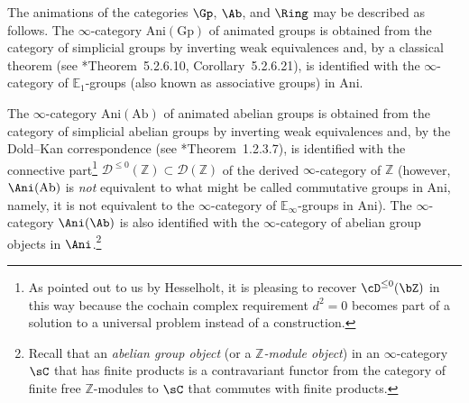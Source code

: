 \beg \label{ani-egs}
The animations of the categories $\Gp$, $\Ab$, and $\Ring$ may be described as follows.
\benuma
\m
The $\infty$-category $\mathrm{Ani}(\mathrm{Gp})$ of animated groups is obtained from the category of simplicial groups by inverting weak equivalences and, by a classical theorem (see \cite{HA}*{Theorem~5.2.6.10, Corollary~5.2.6.21}), is identified with the $\infty$-category of $\mathbb E_1$-groups (also known as associative groups) in $\mathrm{Ani}$.

\m
The $\infty$-category $\mathrm{Ani}(\mathrm{Ab})$
of animated abelian groups is obtained from the category of simplicial abelian groups by inverting weak equivalences and, by the Dold--Kan correspondence (see \cite{HA}*{Theorem~1.2.3.7}), %
is identified with the connective part\footnote{As pointed out to us by Hesselholt, it is pleasing to recover $\cD^{\le 0}(\bZ)$ in this way because the cochain complex requirement $d^2 = 0$ becomes part of a solution to a universal problem instead of a construction. } $\mathcal{D}^{\leq 0}(\mathbb Z)\subset \mathcal D(\mathbb Z)$ of the derived $\infty$-category of $\mathbb Z$ %
(however, $\Ani(\mathrm{Ab})$ is \emph{not} equivalent to what might be called commutative groups in $\mathrm{Ani}$, namely, it is not equivalent to the $\infty$-category of  $\mathbb E_\infty$-groups in $\mathrm{Ani}$). %
The $\infty$-category $\Ani(\Ab)$ is also identified with the $\infty$-category of abelian group objects in $\Ani$.\footnote{Recall that an \emph{abelian group object} (or a \emph{$\mathbb Z$-module object}) in an $\infty$-category $\sC$ that has finite products is a contravariant functor from the category of finite free $\mathbb Z$-modules to $\sC$ that commutes with finite products.} %


